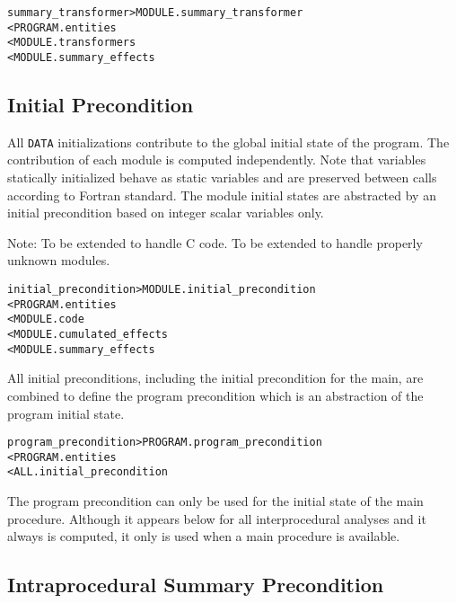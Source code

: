 \documentclass[a4paper]{report}
\newenvironment{PipsMake}{\begin{alltt}}{\end{alltt}}
\begin{document}
\begin{PipsMake}
summary_transformer             > MODULE.summary_transformer
        < PROGRAM.entities
        < MODULE.transformers
        < MODULE.summary_effects
\end{PipsMake}

\subsection{Initial Precondition}
\label{subsubsection-initial-precs}

All \texttt{DATA} initializations contribute to the global initial state
of the program. The contribution of each module is computed independently.
Note that variables statically initialized behave as static variables and
are preserved between calls according to Fortran standard. The module
initial states are abstracted by an initial precondition based on integer
scalar variables only.

Note: To be extended to handle C code. To be extended to handle properly
unknown modules.

\begin{PipsMake}
initial_precondition     > MODULE.initial_precondition
        < PROGRAM.entities
        < MODULE.code
        < MODULE.cumulated_effects
        < MODULE.summary_effects
\end{PipsMake}

All initial preconditions, including the initial precondition for the
main, are combined to define the program precondition which is an
abstraction of the program initial state.

\begin{PipsMake}
program_precondition     > PROGRAM.program_precondition
        < PROGRAM.entities
        < ALL.initial_precondition
\end{PipsMake}

The program precondition can only be used for the initial state of the
main procedure. Although it appears below for all interprocedural analyses
and it always is computed, it only is used when a main procedure is
available.

\subsection{Intraprocedural Summary Precondition}
\end{document}
